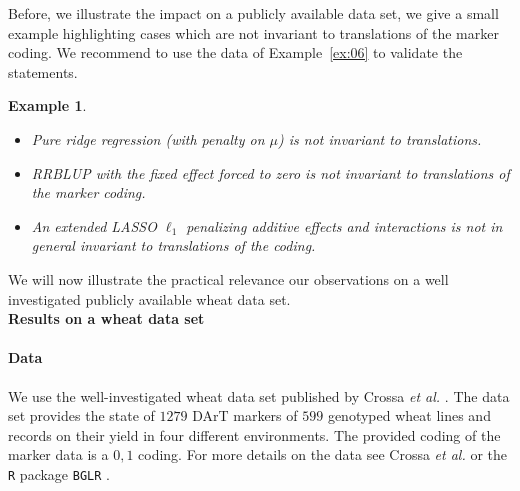 \documentclass{bmcart}
\newtheorem{example}{Example}
\newcommand{\0}{\mathbf{0}}
\begin{document}
Before, we illustrate the impact on a publicly available data set, we give a small example highlighting cases which are not invariant to translations of the marker coding.
We recommend to use the data of Example~\ref{ex:06} to validate the statements.

\begin{example}~\\
	\begin{itemize} \item[a)] Pure ridge regression (with penalty on $\mu$) is not invariant to translations. 
		\item[b)] RRBLUP with the fixed effect forced to zero is not invariant to translations of the marker coding.
				\item[c)] An extended LASSO $\ell_1$ penalizing additive effects and interactions is not in general invariant to translations of the coding.
	\end{itemize}
\end{example} We will now illustrate the practical relevance our observations on a well investigated publicly available wheat data set. \vspace{0.4cm}\\
{\bf Results on a wheat data set}\\

  
\paragraph{Data} We use the well-investigated wheat data set published by Crossa {\it et al.} \cite{Crossa10}. The data set provides the state of $1279$ DArT markers of $599$ genotyped wheat lines and records on their yield in four different environments. The provided coding of the marker data is a $0,1$ coding. For more details on the data see Crossa {\it et al.} \cite{Crossa10} or the \texttt{R} \cite{RCoreTeam2016R:Computing} package \texttt{BGLR} \cite{BGLR}. \\
\end{document}
